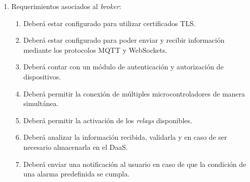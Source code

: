 \begin{enumerate}
	\item Requerimientos asociados al \textit{broker}:
		\begin{enumerate}
			\item Deberá estar configurado para utilizar certificados TLS.
			\item Deberá estar configurado para poder enviar y recibir información mediante los protocolos MQTT y WebSockets.
		    \item Deberá contar con un módulo de autenticación y autorización de dispositivos.
			\item Deberá permitir la conexión de múltiples microcontroladores de manera simultánea.
			\item Deberá permitir la activación de los \textit{relays} disponibles.
			\item Deberá analizar la información recibida, validarla y en caso de ser necesario almacenarla en el DaaS.
			\item Deberá enviar una notificación al usuario en caso de que la condición de una alarma predefinida se cumpla.
		\end{enumerate}
		

\end{enumerate}
